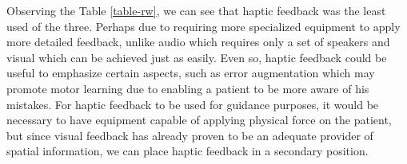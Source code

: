 
Observing the Table \ref{table-rw}, we can see that haptic feedback was 
the least used of the three. Perhaps due to requiring more specialized equipment to apply more 
detailed feedback, unlike audio which requires only a set of speakers and visual which can be 
achieved just as easily. Even so, haptic feedback could be useful to emphasize certain aspects, 
such as error augmentation \cite{Causo2011} which may promote motor learning due to enabling a 
patient to be more aware of his mistakes\cite{Sigrist2013}.
For haptic feedback to be used for guidance purposes, it would be necessary to have equipment 
capable of applying physical force on the patient, but since visual feedback has already proven 
to be an adequate provider of spatial information, we can place haptic feedback in a secondary 
position.
 
 
